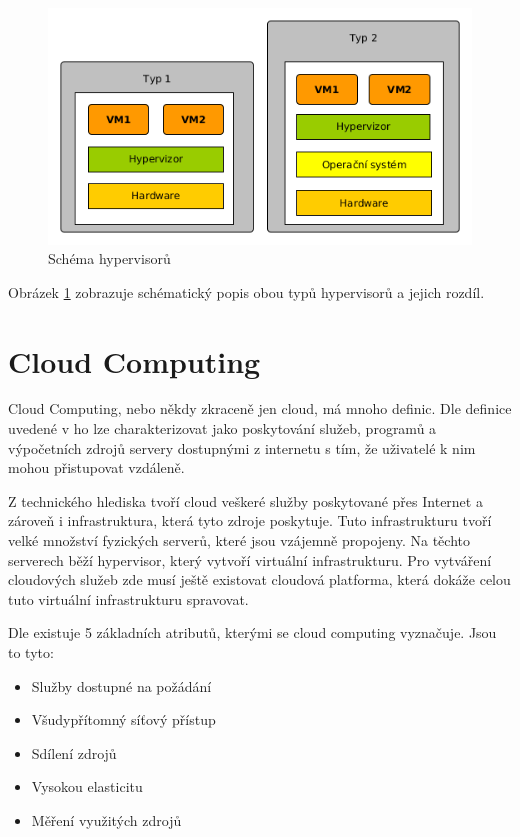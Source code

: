 \begin{figure}[h]
\begin{centering}
\includegraphics[scale=0.5]{images/virtualization}
\par\end{centering}
\caption{Schéma hypervisorů \label{fig:virtualization}}
\end{figure}

Obrázek \ref{fig:virtualization} zobrazuje schématický popis obou typů hypervisorů a jejich rozdíl.

\section{Cloud Computing}

Cloud Computing, nebo někdy zkraceně jen cloud, má mnoho definic. Dle definice uvedené v \cite{Cloud_book} ho lze charakterizovat jako poskytování služeb, programů a výpočetních zdrojů servery dostupnými z internetu s tím, že uživatelé k nim mohou přistupovat vzdáleně.

Z technického hlediska tvoří cloud veškeré služby poskytované přes Internet a zároveň i infrastruktura, která tyto zdroje poskytuje. Tuto infrastrukturu tvoří velké množství fyzických serverů, které jsou vzájemně propojeny. Na těchto serverech běží hypervisor, který vytvoří virtuální infrastrukturu. Pro vytváření cloudových služeb zde musí ještě existovat cloudová platforma, která dokáže celou tuto virtuální infrastrukturu spravovat. \cite{Cloud_book}

Dle \cite{Cloud_book} existuje 5 základních atributů, kterými se cloud computing vyznačuje. Jsou to tyto:

\begin{itemize}
\item Služby dostupné na požádání
\item Všudypřítomný síťový přístup
\item Sdílení zdrojů
\item Vysokou elasticitu
\item Měření využitých zdrojů
\end{itemize}

